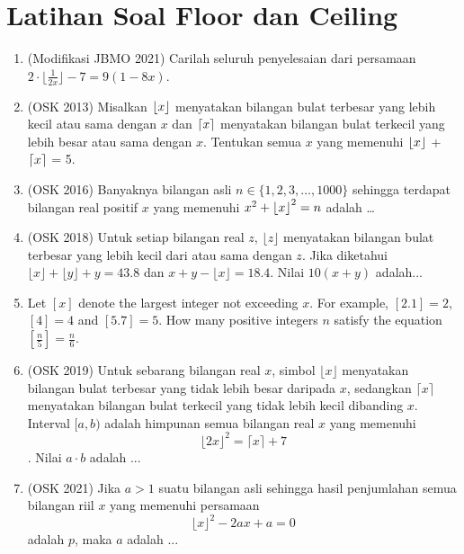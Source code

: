 \documentclass[12pt]{scrartcl}
\begin{document}
\section{Latihan Soal Floor dan Ceiling}
\begin{enumerate}
    \item (Modifikasi JBMO 2021) Carilah seluruh penyelesaian dari persamaan $2\cdot \lfloor{\frac{1}{2x}}\rfloor - 7 = 9(1 - 8x)$.

    \item (OSK 2013) Misalkan $\left\lfloor x \right\rfloor$ menyatakan bilangan bulat terbesar yang lebih kecil atau sama dengan $x$ dan $\left\lceil x \right\rceil$ menyatakan bilangan bulat terkecil yang lebih besar atau sama dengan $x$. Tentukan semua $x$ yang memenuhi $\left\lfloor x \right\rfloor$ + $\left\lceil x \right\rceil$ = 5.
    
    \item (OSK 2016) Banyaknya bilangan asli $n \in \{1,2,3,\dots,1000\}$ sehingga terdapat bilangan real positif $x$ yang memenuhi $x^2+\left\lfloor x \right\rfloor^2=n$ adalah \dots
    
    \item (OSK 2018) Untuk setiap bilangan real $z$, $\lfloor z \rfloor$ menyatakan bilangan bulat terbesar yang lebih kecil dari atau sama dengan $z$. Jika diketahui $\lfloor x \rfloor + \lfloor y \rfloor + y = 43.8$ dan $x + y - \lfloor x \rfloor = 18.4$. Nilai $10(x + y)$ adalah...
    
    \item Let $[x]$ denote the largest integer not exceeding $x$. For example, $[2.1]=2$, $[4]=4$ and $[5.7]=5$. How many positive integers $n$ satisfy the equation $\left[\frac{n}{5}\right]=\frac{n}{6}$.

    \item (OSK 2019) Untuk sebarang bilangan real $x$, simbol $\lfloor x \rfloor$ menyatakan bilangan bulat terbesar yang tidak lebih besar daripada $x$, sedangkan $\lceil x \rceil$ menyatakan bilangan bulat terkecil yang tidak lebih kecil dibanding $x$. Interval $[a, b)$ adalah himpunan semua bilangan real $x$ yang memenuhi
    $$\lfloor 2x \rfloor^2 = \lceil x \rceil + 7$$.
    Nilai $a \cdot b$ adalah ...

    \item (OSK 2021) Jika $a > 1$ suatu bilangan asli sehingga hasil penjumlahan semua bilangan riil $x$ yang memenuhi persamaan
    $$\lfloor x \rfloor^2 - 2ax + a = 0$$
    adalah $p$, maka $a$ adalah ...


\end{enumerate}
\end{document}
